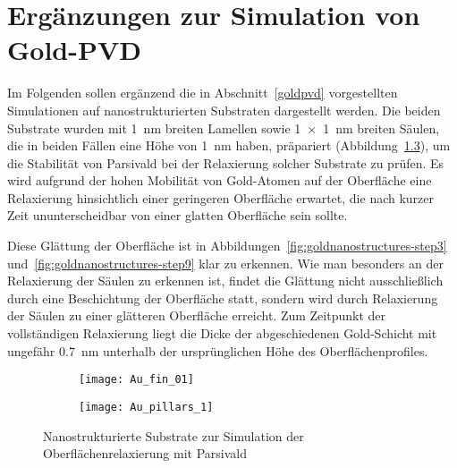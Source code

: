 \chapter{Ergänzungen zur Simulation von Gold-PVD}

Im Folgenden sollen ergänzend die in Abschnitt~\ref{goldpvd} vorgestellten Simulationen auf nanostrukturierten Substraten dargestellt werden.
Die beiden Substrate wurden mit \SI{1}{\nano\meter} breiten Lamellen sowie \SI{1x1}{\nano\meter} breiten Säulen, die in beiden Fällen eine Höhe von \SI{1}{\nano\meter} haben, präpariert (Abbildung~\ref{fig:goldnanostructures}), um die Stabilität von Parsivald bei der Relaxierung solcher Substrate zu prüfen.
Es wird aufgrund der hohen Mobilität von Gold-Atomen auf der Oberfläche eine Relaxierung hinsichtlich einer geringeren Oberfläche erwartet, die nach kurzer Zeit ununterscheidbar von einer glatten Oberfläche sein sollte.

Diese Glättung der Oberfläche ist in Abbildungen~\ref{fig:goldnanostructures-step3} und~\ref{fig:goldnanostructures-step9} klar zu erkennen.
Wie man besonders an der Relaxierung der Säulen zu erkennen ist, findet die Glättung nicht ausschließlich durch eine Beschichtung der Oberfläche statt, sondern wird durch Relaxierung der Säulen zu einer glätteren Oberfläche erreicht.
Zum Zeitpunkt der vollständigen Relaxierung liegt die Dicke der abgeschiedenen Gold-Schicht mit ungefähr \SI{0.7}{\nano\meter} unterhalb der ursprünglichen Höhe des Oberflächenprofiles.

\vspace{3em}

\begin{figure}[bh]
  \captionsetup[subfigure]{singlelinecheck=false}
  \def\subfigwidth{0.49\textwidth}

  \begin{subfigure}[t]{\subfigwidth}
    \texttt{[image: Au\_fin\_01]}
    \label{fig:goldnanostructures-fins}
  \end{subfigure}
  \hfill
  \begin{subfigure}[t]{\subfigwidth}
    \texttt{[image: Au\_pillars\_1]}
    \label{fig:goldnanostructures-columns}
  \end{subfigure}

  \caption{Nanostrukturierte Substrate zur Simulation der Oberflächenrelaxierung mit Parsivald}
  \label{fig:goldnanostructures}

\end{figure}

